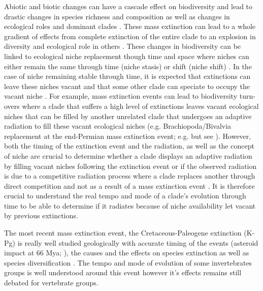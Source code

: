 \documentclass[12pt,letterpaper]{article}
\begin{document}
Abiotic and biotic changes can have a cascade effect on biodiversity and lead to drastic changes in species richness and composition as well as changes in ecological roles and dominant clades \citep{Brusatte12092008}. These mass extinction can lead to a whole gradient of effects
from complete extinction of the entire clade to an explosion in diversity and ecological role in others \citep[e.g.][]{Erwin1998344}. These changes in biodiversity can be linked to ecological niche replacement though time and space where niches can either remain the same through time (niche stasis) or shift (niche shift) \cite{Pearman2008149}. In the case of niche remaining stable through time, it is expected that extinctions can leave these niches vacant and that some other clade can speciate to occupy the vacant niche \cite{Pearman2008149}. For example, mass extinction events can lead to biodiversity turn-overs where a clade that suffers a high level of extinctions leaves vacant ecological niches that can be filled by another unrelated clade that undergoes an adaptive radiation to fill these vacant ecological niches (e.g. Brachiopoda/Bivalvia replacement at the end-Permian mass extinction event; e.g. \citealt{Sepkiski1981,CLAPHAM01102006} but see \citealt{Payne22052014}). However, both the timing of the extinction event and the radiation, as well as the concept of niche are crucial to determine whether a clade displays an adaptive radiation by filling vacant niches following the extinction event or if the observed radiation is due to a competitive radiation process where a clade replaces another through direct competition and not as a result of a mass extinction event \citep[e.g.][]{Brusatte12092008,bentonmodels2014}. It is therefore crucial to understand the real tempo and mode of a clade's evolution through time to be able to determine if it radiates because of niche availability let vacant by previous extinctions.

The most recent mass extinction event, the Cretaceous-Paleogene extinction (K-Pg) is really well studied geologically with accurate timing of the events (asteroid impact at 66 Mya; \citealt{rennetime2013}), the causes \citep[e.g.][]{rennetime2013,BRV:BRV12128} and the effects on species extinction \citep[e.g.][]{Erwin1998344,BRV:BRV12128} as well as species diversification \citep[e.g.][]{Stadler12042011,meredithimpacts2011,O'Leary08022013}. The tempo and mode of evolution of some invertebrates groups is well understood around this event \citep[e.g.][]{Erwin1998344} however it's effects remains still debated for vertebrate groups.
\end{document}
